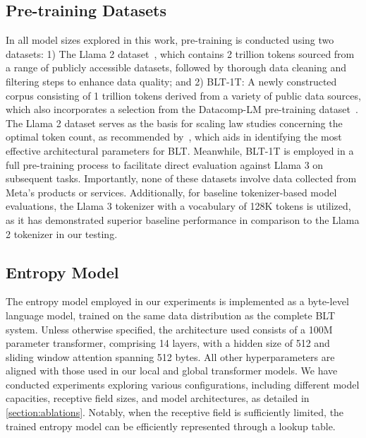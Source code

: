 \subsection{Pre-training Datasets} In all model sizes explored in this work, pre-training is conducted using two datasets: 1) The Llama 2 dataset~\citep{touvron2023llama}, which contains 2 trillion tokens sourced from a range of publicly accessible datasets, followed by thorough data cleaning and filtering steps to enhance data quality; and 2) {\textsc BLT}-1T: A newly constructed corpus consisting of 1 trillion tokens derived from a variety of public data sources, which also incorporates a selection from the Datacomp-LM pre-training dataset~\citep{li2024datacomp}. The Llama 2 dataset serves as the basis for scaling law studies concerning the optimal token count, as recommended by~\cite{dubey2024llama}, which aids in identifying the most effective architectural parameters for {\textsc BLT}. Meanwhile, {\textsc BLT}-1T is employed in a full pre-training process to facilitate direct evaluation against Llama 3 on subsequent tasks. Importantly, none of these datasets involve data collected from Meta's products or services. Additionally, for baseline tokenizer-based model evaluations, the Llama 3 tokenizer with a vocabulary of 128K tokens is utilized, as it has demonstrated superior baseline performance in comparison to the Llama 2 tokenizer in our testing.

\subsection{Entropy Model} The entropy model employed in our experiments is implemented as a byte-level language model, trained on the same data distribution as the complete {\textsc BLT} system. Unless otherwise specified, the architecture used consists of a 100M parameter transformer, comprising 14 layers, with a hidden size of 512 and sliding window attention spanning 512 bytes. All other hyperparameters are aligned with those used in our local and global transformer models. We have conducted experiments exploring various configurations, including different model capacities, receptive field sizes, and model architectures, as detailed in \autoref{section:ablations}. Notably, when the receptive field is sufficiently limited, the trained entropy model can be efficiently represented through a lookup table.

